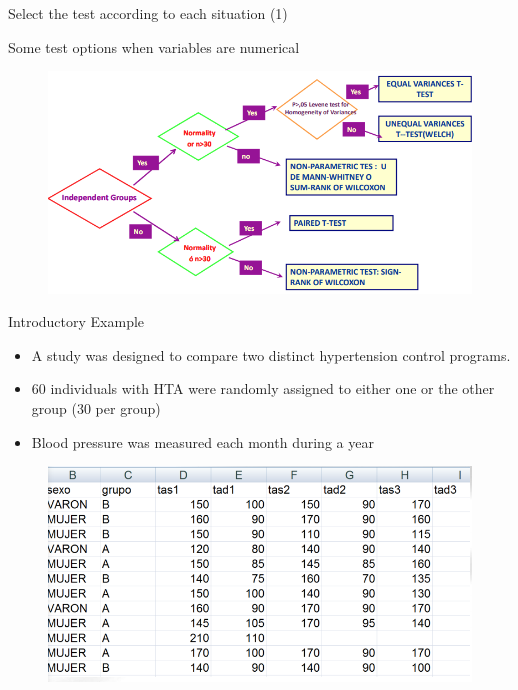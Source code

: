 \documentclass[
  ignorenonframetext,
]{beamer}
\providecommand{\tightlist}{%
  \setlength{\itemsep}{0pt}\setlength{\parskip}{0pt}}
\begin{document}
\begin{frame}{Select the test according to each situation (1)}
\protect\hypertarget{select-the-test-according-to-each-situation-1}{}
\begin{block}{Some test options when variables are numerical}
\protect\hypertarget{some-test-options-when-variables-are-numerical}{}
\begin{figure}
\includegraphics[width=0.8\linewidth,height=1\textheight]{images/tests4numericalVariables} \end{figure}
\end{block}
\end{frame}

\begin{frame}{Introductory Example}
\protect\hypertarget{introductory-example}{}
\begin{itemize}
\tightlist
\item
  A study was designed to compare two distinct hypertension control
  programs.
\item
  60 individuals with HTA were randomly assigned to either one or the
  other group (30 per group)
\item
  Blood pressure was measured each month during a year
\end{itemize}

\begin{figure}
\includegraphics[width=0.9\linewidth,height=0.9\textheight]{images/ExampleDataHTA} \end{figure}
\end{frame}
\end{document}
